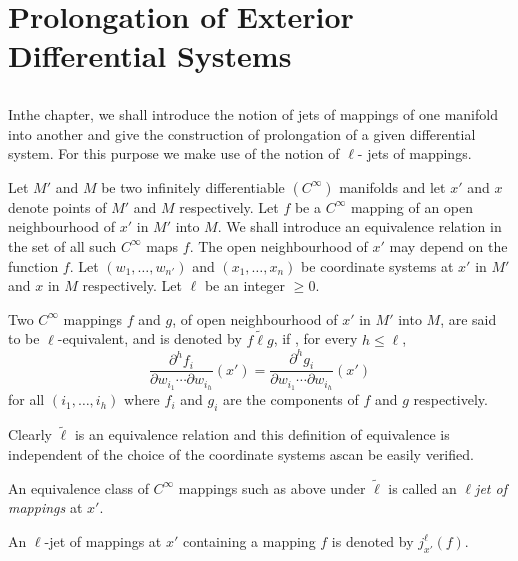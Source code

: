 
\chapter{Prolongation of Exterior Differential Systems}\label{chap3} %

\section{}\label{chap3:sec3.1}%

In\pageoriginale the chapter, we shall introduce the notion of jets of mappings of
one manifold into another and give the construction of prolongation of
a given differential system. For this purpose we make use of the
notion  of $\ell $- jets of mappings. 

Let $M'$ and $M$ be two infinitely differentiable $(C^\infty)$
manifolds and let $x'$ and $x$ denote points of $M'$ and  $M$
respectively. Let $f$ be a $C^\infty$ mapping  of an open
neighbourhood of $x'$ in $M'$ into $M$. We shall introduce an
equivalence relation in the set of all such $C^\infty$ maps $f$. The
open neighbourhood of $x'$ may depend on the function $f$. Let $(w_1,
\ldots , w_{n'})$ and $(x_1,  \ldots , x_n)$ be coordinate systems at
$x'$ in $M'$ and $x$ in $M$ respectively. Let $\ell$ be an integer
$\ge 0$. 

\begin{defi*}
  Two  $C^\infty$ mappings $f$ and $g$, of open neighbourhood of $x' $
  in $M'$ into $M$, are said to be $\ell$-equivalent, and is denoted
  by $f \tilde{\ell} g$, if , for every $h \le \ell$, 
  $$
  \frac{\partial^h f_i}{\partial w_{i_1} \cdots \partial w_{i_h}} (x')
  = \frac{\partial^h g_i}{\partial w_{i_1} \cdots \partial w_{i_h}}
  (x') 
  $$
  for all $(i_1,  \ldots , i_h)$ where $f_i$ and $g_i$ are the
  components of  $f$ and $g$ respectively. 
\end{defi*}   

Clearly $\tilde{\ell}$ is an equivalence relation and this definition
of equivalence is independent of the choice of the coordinate systems
as\pageoriginale can be easily verified. 
   
\begin{defi*}
  An equivalence class of $C^\infty$ mappings such as above under
  $\tilde{\ell}$ is called an $\ell${\em jet of mappings} at $x'$. 
  
  An  $\ell$-jet of mappings at $x'$ containing a mapping $f$ is
  denoted by $j^\ell_{x'}(f)$.  
\end{defi*} 
    
